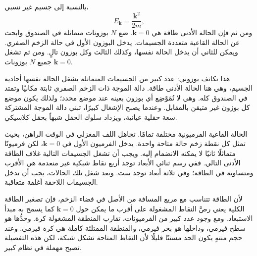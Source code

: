 بالنسبة إلى جسيم غير نسبي،
\begin{equation}
E_{\mathbf{k}}=\frac{\mathbf{k}^2}{2m},
\end{equation}
ومن ثم فإن الحالة الأدنى طاقة هي \(\mathbf{k}=0\). ضع \(N\) بوزونات متماثلة في الصندوق وابحث عن الحالة القاعية متعددة الجسيمات. يدخل البوزون الأول في حالة الزخم الصفري. ويمكن للثاني أن يدخل الحالة نفسها، وكذلك الثالث وكل بوزون تالٍ. ومن ثم تشغل جميع \(N\) بوزونات \(\mathbf{k}=0\).

هذا تكاثف بوزوني: عدد كبير من الجسيمات المتماثلة يشغل الحالة نفسها أحادية الجسيم، وهي هنا الحالة الأدنى طاقة. دالة الموجة ذات الزخم الصفري ثابتة مكانيًا وتمتد في الصندوق كله. وهي لا تُمَوْضِع أي بوزون بعينه عند موضع محدد؛ ولذلك يكون موضع كل بوزون غير متيقن بالمقابل. وعندما يصبح الإشغال كبيرًا، تبني دالة الموجة المشتركة سعة حقلية عيانية، ويزداد سلوك الحقل شبهاً بحقل كلاسيكي.

الحالة القاعية الفرميونية مختلفة تمامًا. تجاهل اللف المغزلي في الوقت الراهن، بحيث تمثل كل نقطة زخم حالة متاحة واحدة. يدخل الفرميون الأول في \(\mathbf{k}=0\)، لكن فرميونًا متماثلًا ثانيًا لا يمكنه الانضمام إليه. ويجب أن تشغل الجسيمات التالية غلاف الطاقة الأدنى التالي. ففي رسم ثنائي الأبعاد توجد أربع نقاط شبكية غير منعدمة هي الأقرب ومتساوية في الطاقة؛ وفي ثلاثة أبعاد توجد ست. وبعد شغل تلك الحالات، يجب أن تدخل الجسيمات اللاحقة أغلفة متعاقبة.

لأن الطاقة تتناسب مع مربع المسافة من الأصل في فضاء الزخم، فإن تصغير الطاقة الكلية يعني رصَّ النقاط المشغولة على أقرب ما يمكن حول \(\mathbf{k}=0\) كما يسمح به مبدأ الاستبعاد. ومع وجود عدد كبير من الفرميونات، تقارب المنطقة المشغولة كرة. وحدُّها هو سطح فيرمي، وداخلها هو بحر فيرمي، والمنطقة الممتلئة كاملة هي كرة فيرمي. وعند حجم منتهٍ يكون الحد مسننًا قليلًا لأن النقاط المتاحة تشكل شبكة، لكن هذه التفصيلة تصبح مهملة في نظام كبير.

